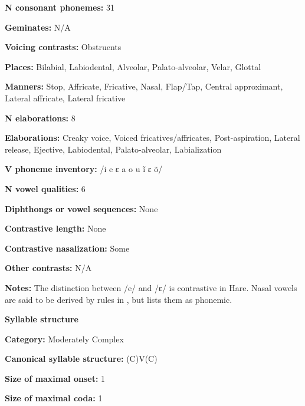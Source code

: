 \textbf{N consonant phonemes:} 31



\textbf{Geminates:} N/A



\textbf{Voicing contrasts:} Obstruents



\textbf{Places:} Bilabial, Labiodental, Alveolar, Palato-alveolar, Velar, Glottal



\textbf{Manners:} Stop, Affricate, Fricative, Nasal, Flap/Tap, Central approximant, Lateral affricate, Lateral fricative



\textbf{N elaborations:} 8



\textbf{Elaborations:} Creaky voice, Voiced fricatives/affricates, Post-aspiration, Lateral release, Ejective, Labiodental, Palato-alveolar, Labialization



\textbf{V phoneme inventory:} /i e ɛ a o u ĩ ɛ õ/



\textbf{N vowel qualities:} 6



\textbf{Diphthongs or vowel sequences:} None



\textbf{Contrastive length:} None



\textbf{Contrastive nasalization:} Some



\textbf{Other contrasts:} N/A



\textbf{Notes:} The distinction between /e/ and /ɛ/ is contrastive in Hare. Nasal vowels are said to be derived by rules in \citet{Rice1989}, but \citet{Rice2005} lists them as phonemic.



\textbf{Syllable structure}



\textbf{Category:} Moderately Complex



\textbf{Canonical syllable structure:} (C)V(C) \citep[143-53]{Rice1989}



\textbf{Size of maximal onset:} 1



\textbf{Size of maximal coda:} 1



